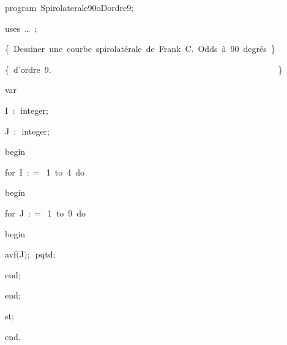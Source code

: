 
{
\parindent {}
\medskip

\carrenoir
\vspace{\neglskip}\mbox{\blc  \idt  \mcl program\idt \ Spirolaterale90oDordre9$;$
}\par 
\vspace{\neglskip}\mbox{\blc \blk\idt \mcl uses\idt \ \ldots\ $;$
}\par 
\vspace{\neglskip}\mbox{\blc  \blk\idt  \cmt  \{\ Dessiner\ une\ courbe\ spirolatérale\ de\ Frank\ C.\ Odds\ à\ 90\ degrés\ \}\idt }\par 
\vspace{\neglskip}\mbox{\blc  \blk\idt  \cmt  \{\ d{'}ordre\ 9.\ \ \ \ \ \ \ \ \ \ \ \ \ \ \ \ \ \ \ \ \ \ \ \ \ \ \ \ \ \ \ \ \ \ \ \ \ \ \ \ \ \ \ \ \ \ \ \ \ \ \ \ \ \}\idt }\par 
\pagebreak[3] 
\vspace{\neglskip}\mbox{\blc  \blk\idt  \mcl var\idt }\par 
\vspace{\neglskip}\mbox{\blc  \blk\blk\idt  I\ $:$\ integer$;$}\par 
\vspace{\neglskip}\mbox{\blc  \blk\blk\idt  J\ $:$\ integer$;$}\par 
\vspace{\neglskip}\mbox{\blc  \idt  \mcl begin\idt }\par 
\pagebreak[3] 
\vspace{\neglskip}\mbox{\blc  \blk\idt  \mcl for\idt \ I\ $:$$=$\ 1\ \mcl to\idt \ 4\ \mcl do\idt \ }\par 
\vspace{\neglskip}\mbox{\blc  \blk\blk\idt  \mcl begin\idt }\par 
\pagebreak[3] 
\vspace{\neglskip}\mbox{\blc  \blk\blk\blk\idt  \mcl for\idt \ J\ $:$$=$\ 1\ \mcl to\idt \ 9\ \mcl do\idt }\par 
\vspace{\neglskip}\mbox{\blc  \blk\blk\blk\blk\idt  \mcl begin\idt }\par 
\vspace{\neglskip}\mbox{\blc  \blk\blk\blk\blk\blk\idt  avf$($J$)$$;$\ pqtd$;$}\par 
\vspace{\neglskip}\mbox{\blc  \blk\blk\blk\blk\idt  \mcl end\idt $;$}\par 
\vspace{\neglskip}\mbox{\blc  \blk\blk\idt  \mcl end\idt $;$}\par 
\vspace{\neglskip}\mbox{\blc  \blk\idt  st$;$}\par 
\vspace{\neglskip}\mbox{\blc  \idt  \mcl end\idt $.$}\par 

\medskip }

